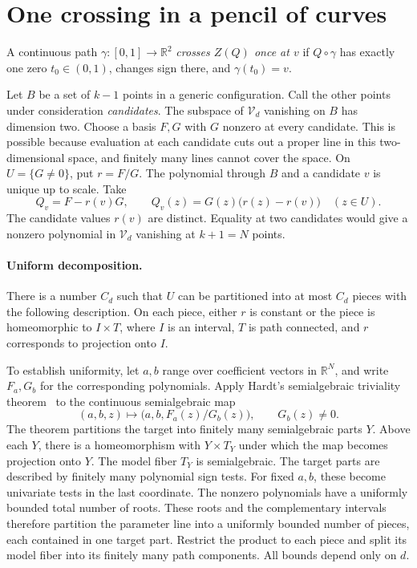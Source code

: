 \documentclass[11pt,letterpaper]{article}
\newcommand{\R}{\mathbb R}
\newcommand{\Vd}{\mathcal V_d}
\begin{document}
\section{One crossing in a pencil of curves}\label{sec:weakcrossing}
A continuous path $\gamma:[0,1]\to\R^2$ \emph{crosses $Z(Q)$ once at $v$} if $Q\circ\gamma$ has exactly one zero $t_0\in(0,1)$, changes sign there, and $\gamma(t_0)=v$.

Let $B$ be a set of $k-1$ points in a generic configuration. Call the other points under consideration \emph{candidates}. The subspace of $\Vd$ vanishing on $B$ has dimension two. Choose a basis $F,G$ with $G$ nonzero at every candidate. This is possible because evaluation at each candidate cuts out a proper line in this two-dimensional space, and finitely many lines cannot cover the space. On $U=\{G\neq0\}$, put $r=F/G$. The polynomial through $B$ and a candidate $v$ is unique up to scale. Take
\[
Q_v=F-r(v)G,\qquad
Q_v(z)=G(z)\bigl(r(z)-r(v)\bigr)\quad(z\in U).
\]
The candidate values $r(v)$ are distinct. Equality at two candidates would give a nonzero polynomial in $\Vd$ vanishing at $k+1=N$ points.

\paragraph{Uniform decomposition.}
There is a number $C_d$ such that $U$ can be partitioned into at most $C_d$ pieces with the following description. On each piece, either $r$ is constant or the piece is homeomorphic to $I\times T$, where $I$ is an interval, $T$ is path connected, and $r$ corresponds to projection onto $I$.

To establish uniformity, let $a,b$ range over coefficient vectors in $\R^N$, and write $F_a,G_b$ for the corresponding polynomials. Apply Hardt's semialgebraic triviality theorem~\cite{hardt} to the continuous semialgebraic map
\[
(a,b,z)\longmapsto\bigl(a,b,F_a(z)/G_b(z)\bigr),\qquad G_b(z)\neq0.
\]
The theorem partitions the target into finitely many semialgebraic parts $Y$. Above each $Y$, there is a homeomorphism with $Y\times T_Y$ under which the map becomes projection onto $Y$. The model fiber $T_Y$ is semialgebraic. The target parts are described by finitely many polynomial sign tests. For fixed $a,b$, these become univariate tests in the last coordinate. The nonzero polynomials have a uniformly bounded total number of roots. These roots and the complementary intervals therefore partition the parameter line into a uniformly bounded number of pieces, each contained in one target part. Restrict the product to each piece and split its model fiber into its finitely many path components. All bounds depend only on $d$.
\end{document}
